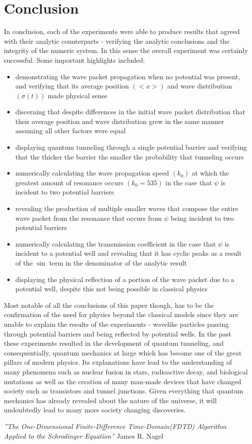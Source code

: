 \documentclass[twocolumn]{article}
\begin{document}
\section{Conclusion}
In conclusion, each of the experiments were able to produce results that agreed with their analytic counterparts - verifying the analytic conclusions and the integrity of the numeric system. In this sense the overall experiment was certainly successful. Some important highlights included: 
\begin{itemize}
\item demonstrating the wave packet propagation when no potential was present, and verifying that its average position $(<x>)$ and wave distribution $(\sigma(t))$ made physical sense
\item discerning that despite differences in the initial wave packet distribution that their average position and wave distribution grew in the same manner assuming all other factors were equal
\item displaying quantum tunneling through a single potential barrier and verifying that the thicker the barrier the smaller the probability that tunneling occurs
\item numerically calculating the wave propagation speed $(k_0)$ at which the greatest amount of resonance occurs $(k_0=535)$ in the case that $\psi$ is incident to two potential barriers 
\item revealing the production of multiple smaller waves that compose the entire wave packet from the resonance that occurs from $\psi$ being incident to two potential barriers
\item numerically calculating the transmission coefficient in the case that $\psi$ is incident to a potential well and revealing that it has cyclic peaks as a result of the $\sin$ term in the denominator of the analytic result 
\item displaying the physical reflection of a portion of the wave packet due to a potential well, despite this not being possible in classical physics
\end{itemize}
Most notable of all the conclusions of this paper though, has to be the confirmation 
of the need for physics beyond the classical models since they are unable to explain the results of the experiments - wavelike particles passing through potential barriers and being reflected by potential wells. In the past these experiments resulted in the development of quantum tunneling, and consequentially, quantum mechanics at large which has become one of the great pillars of modern physics. Its explanations have lead to the understanding of many phenomena such as nuclear fusion in stars, radioactive decay, and biological mutations as well as the creation of many man-made devices that have changed society such as transistors and tunnel junctions. Given everything that quantum mechanics has already revealed about the nature of the universe, it will undoubtedly lead to many more society changing discoveries.
\begin{thebibliography}{9}
\textit{''The One-Dimensional Finite-Difference Time-Domain(FDTD) Algorithm Applied to the Schrodinger Equation''}
James R. Nagel
\end{thebibliography}
\end{document}
